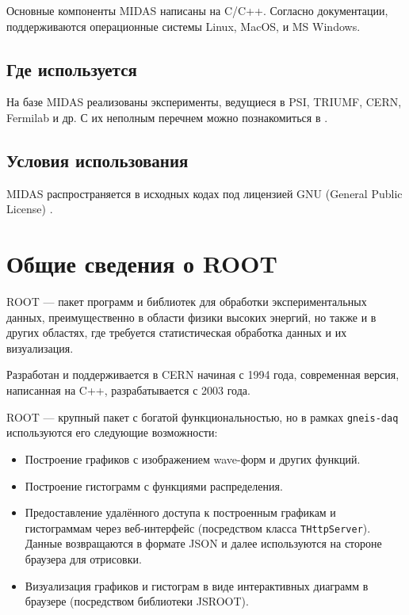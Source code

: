 \documentclass[12pt, a4paper, oneside, onecolumn]{book}
\newcommand{\GD}{{\tt gneis-daq}}
\newcommand{\MIDAS}{\mbox{MIDAS}}
\newcommand{\ROOT}{\mbox{ROOT}}
\newcommand{\ROOTJS}{\mbox{JSROOT}}
\newcommand{\CPPCLASS}[1]{\mbox{\tt #1}}
\begin{document}
Основные компоненты \MIDAS{} написаны на C/C++. Согласно документации, поддерживаются операционные системы Linux, MacOS, и MS Windows.

\subsection{Где используется}

На базе \MIDAS{} реализованы эксперименты, ведущиеся в PSI, TRIUMF, CERN, Fermilab и др. С их неполным перечнем можно познакомиться в \cite{MidasWikiWorld}.

\subsection{Условия использования}

\MIDAS{} распространяется в исходных кодах под лицензией GNU (General Public License) \cite{midas}.

\section{Общие сведения о \ROOT{}}

\ROOT{} \cite{RootHome} --- пакет программ и библиотек для обработки экспериментальных данных, преимущественно в области физики высоких энергий, но также и в других областях, где требуется статистическая обработка данных и их визуализация.

Разработан и поддерживается в CERN начиная с 1994 года, современная версия, написанная на C++, разрабатывается с 2003 года.

\ROOT{} --- крупный пакет с богатой функциональностью, но в рамках \GD{} используются его следующие возможности:

\begin{itemize}
\item Построение графиков с изображением wave-форм и других функций.
\item Построение гистограмм с функциями распределения.
\item Предоставление удалённого доступа к построенным графикам и гистограммам через веб-интерфейс (посредством класса \CPPCLASS{THttpServer}). Данные возвращаются в формате JSON и далее используются на стороне браузера для отрисовки.
\item Визуализация графиков и гистограм в виде интерактивных диаграмм в браузере (посредством библиотеки \ROOTJS{}).
\end{itemize}
\end{document}
